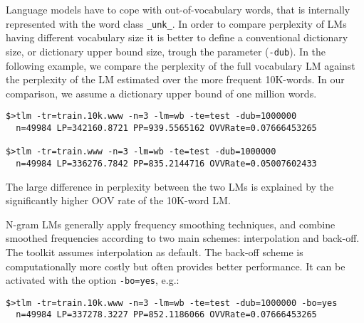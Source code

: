 Language models have to  cope with out-of-vocabulary words, that is internally represented
with the word class  {\tt \_unk\_}.  In order  to
compare perplexity of LMs having  different vocabulary size it is better
to define  a conventional dictionary  size, or dictionary  upper bound
size,  trough the  parameter  ({\tt -dub}).  In  the  following example,  we
compare the perplexity of the full vocabulary LM against the perplexity of the
LM estimated over the more frequent 10K-words. In our comparison, we assume a dictionary 
upper bound of one million words.

\begin{verbatim}
$>tlm -tr=train.10k.www -n=3 -lm=wb -te=test -dub=1000000
  n=49984 LP=342160.8721 PP=939.5565162 OVVRate=0.07666453265

$>tlm -tr=train.www -n=3 -lm=wb -te=test -dub=1000000
  n=49984 LP=336276.7842 PP=835.2144716 OVVRate=0.05007602433
\end{verbatim}


\noindent
The  large  difference  in  perplexity  between the two LMs is   explained  by  the 
significantly higher  OOV rate of the 10K-word LM.

\noindent
N-gram LMs generally apply frequency smoothing techniques, and combine
smoothed frequencies according to  two main schemes: interpolation and
back-off.  The  toolkit assumes interpolation
as default.  The back-off  scheme is computationally more costly but
often provides better performance. It  can be activated with the option
{\tt -bo=yes}, e.g.:

\begin{verbatim}
$>tlm -tr=train.10k.www -n=3 -lm=wb -te=test -dub=1000000 -bo=yes
  n=49984 LP=337278.3227 PP=852.1186066 OVVRate=0.07666453265
\end{verbatim}


